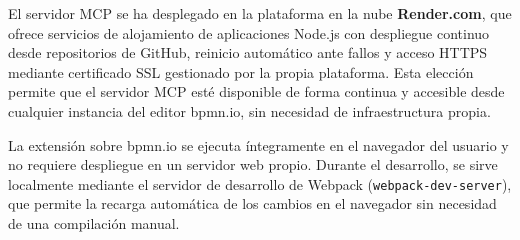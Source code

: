 El servidor MCP se ha desplegado en la plataforma en la nube \textbf{Render.com}, que ofrece servicios de alojamiento de aplicaciones Node.js con despliegue continuo desde repositorios de GitHub, reinicio automático ante fallos y acceso HTTPS mediante certificado SSL gestionado por la propia plataforma. Esta elección permite que el servidor MCP esté disponible de forma continua y accesible desde cualquier instancia del editor bpmn.io, sin necesidad de infraestructura propia.

La extensión sobre bpmn.io se ejecuta íntegramente en el navegador del usuario y no requiere despliegue en un servidor web propio. Durante el desarrollo, se sirve localmente mediante el servidor de desarrollo de Webpack (\texttt{webpack-dev-server}), que permite la recarga automática de los cambios en el navegador sin necesidad de una compilación manual.

\begin{center}
%
\end{center}

